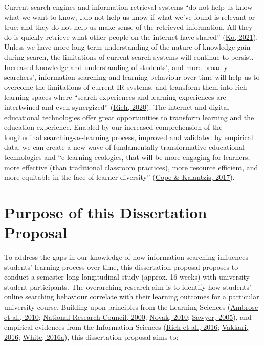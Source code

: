 \documentclass[letterpaper, nobind]{templates/ociamthesis}
\begin{document}
Current search engines and information retrieval systems ``do not help us know what we want to know, \ldots do not help us know if what we've found is relevant or true; and they do not help us make sense of the retrieved information.
All they do is quickly retrieve what other people on the internet have shared'' (\protect\hyperlink{ref-ko2021seeking}{Ko, 2021}).
Unless we have more long-term understanding of the nature of knowledge gain during search, the limitations of current search systems will continue to persist.
Increased knowledge and understanding of students', and more broadly searchers', information searching and learning behaviour over time will help us to overcome the limitations of current IR systems, and transform them into rich learning spaces where ``search experiences and learning experiences are intertwined and even synergized'' (\protect\hyperlink{ref-url-rieh-homepage}{Rieh, 2020}).
The internet and digital educational technologies offer great opportunities to transform learning and the education experience.
Enabled by our increased comprehension of the longitudinal searching-as-learning process, improved and validated by empirical data, we can create a new wave of fundamentally transformative educational technologies and ``e-learning ecologies, that will be more engaging for learners, more effective (than traditional classroom practices), more resource efficient, and more equitable in the face of learner diversity'' (\protect\hyperlink{ref-cope2017elearningc}{Cope \& Kalantzis, 2017}).

\hypertarget{sec-intro-purpose}{%
\section{Purpose of this Dissertation Proposal}\label{sec-intro-purpose}}

To address the gaps in our knowledge of how information searching influences students' learning process over time, this dissertation proposal proposes to conduct a semester-long longitudinal study (approx. 16 weeks) with university student participants.
The overarching research aim is to identify how students' online searching behaviour correlate with their learning outcomes for a particular university course.
Building upon principles from the Learning Sciences (\protect\hyperlink{ref-ambrose2010howa}{Ambrose et al., 2010}; \protect\hyperlink{ref-council2000how}{National Research Council, 2000}; \protect\hyperlink{ref-novak2010learninga}{Novak, 2010}; \protect\hyperlink{ref-sawyer2005cambridge}{Sawyer, 2005}),
and empirical evidences from the Information Sciences (\protect\hyperlink{ref-rieh2016searching}{Rieh et al., 2016}; \protect\hyperlink{ref-vakkari2016searching}{Vakkari, 2016}; \protect\hyperlink{ref-white2016interactions}{White, 2016a}),
this dissertation proposal aims to:
\end{document}
